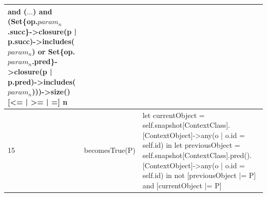 \begin{longtable}{|>{\footnotesize}p{0.6cm}|>{\scriptsize\raggedright\arraybackslash}p{4cm}|>{\scriptsize\raggedright\arraybackslash}p{\dimexpr\textwidth-4.6cm-4\tabcolsep-3\arrayrulewidth\relax}|}
    and ($\ldots$) 
    and (Set\{op.$param_n$.succ\}->closure(p | p.succ)->includes($param_n$) or Set\{op.$param_n$.pred\}->closure(p | p.pred)->includes($param_n$)))->size() [<= | >= | =] n \\
    \hline
    15 &
    becomesTrue(P) &
    let currentObject = self.snapshot[ContextClass].[ContextObject]->any(o | o.id = self.id) in
    let previousObject = self.snapshot[ContextClass].pred().[ContextObject]->any(o | o.id = self.id) in 
    not [previousObject |= P] and [currentObject |= P] \\
    \hline
\end{longtable}
